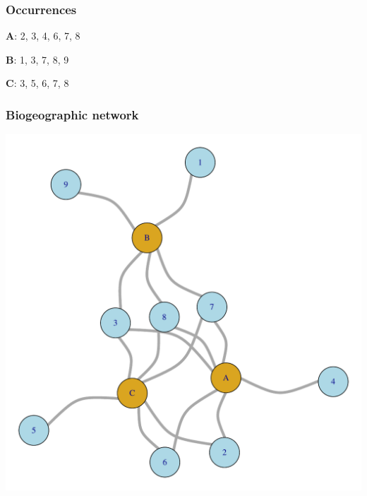 \documentclass{beamer}
\begin{document}
\begin{frame}
  \frametitle{Occurrences}
  \begin{center}
    \textbf{A}: {2, 3, 4, 6, 7, 8}

    \vspace{0.5cm}

    \textbf{B}: {1, 3, 7, 8, 9}

    \vspace{0.5cm}

    \textbf{C}: {3, 5, 6, 7, 8}
  \end{center}

\end{frame}

\begin{frame}
  \frametitle{Biogeographic network}

  \begin{center}
    \includegraphics[height = 0.8\textheight, width = \textwidth, keepaspectratio = true]{figure/sim_graph}
  \end{center}

\end{frame}
\end{document}
